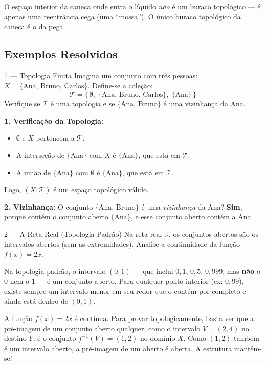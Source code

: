 \begin{notebox}[title={Intuição sobre Buracos}]
  O espaço interior da caneca onde entra o líquido \emph{não} é um buraco topológico — é apenas uma reentrância cega (uma ``mossa''). O único buraco topológico da caneca é o da pega.
\end{notebox}

\subsection{Exemplos Resolvidos}

\begin{exbox}{1 --- Topologia Finita}
  Imagina um conjunto com três pessoas: $X = \{\text{Ana, Bruno, Carlos}\}$. Define-se a coleção:
  \[
    \mathcal{T} = \bigl\{\, \emptyset,\; \{\text{Ana, Bruno, Carlos}\},\; \{\text{Ana}\} \,\bigr\}
  \]
  Verifique se $\mathcal{T}$ é uma topologia e se $\{\text{Ana, Bruno}\}$ é uma vizinhança da Ana.
\end{exbox}
\begin{solbox}
  \textbf{1. Verificação da Topologia:}
  \begin{itemize}
    \item $\emptyset$ e $X$ pertencem a $\mathcal{T}$. \checkmark
    \item A interseção de $\{\text{Ana}\}$ com $X$ é $\{\text{Ana}\}$, que está em $\mathcal{T}$. \checkmark
    \item A união de $\{\text{Ana}\}$ com $\emptyset$ é $\{\text{Ana}\}$, que está em $\mathcal{T}$. \checkmark
  \end{itemize}
  Logo, $(X, \mathcal{T})$ é um espaço topológico válido.
  
  \textbf{2. Vizinhança:}
  O conjunto $\{\text{Ana, Bruno}\}$ é uma \emph{vizinhança} da Ana? \textbf{Sim}, porque contém o conjunto aberto $\{\text{Ana}\}$, e esse conjunto aberto contém a Ana.
\end{solbox}

\begin{exbox}{2 --- A Reta Real (Topologia Padrão)}
  Na reta real $\mathbb{R}$, os conjuntos abertos são os intervalos abertos (sem as extremidades). Analise a continuidade da função $f(x) = 2x$.
\end{exbox}
\begin{solbox}
  Na topologia padrão, o intervalo $(0, 1)$ — que inclui $0{,}1$, $0{,}5$, $0{,}999$, mas \textbf{não} o $0$ nem o $1$ — é um conjunto aberto. Para qualquer ponto interior (ex: $0{,}99$), existe sempre um intervalo menor em seu redor que o contém por completo e ainda está dentro de $(0,1)$.

  A função $f(x) = 2x$ é contínua. Para provar topologicamente, basta ver que a pré-imagem de um conjunto aberto qualquer, como o intervalo $V = (2, 4)$ no destino $Y$, é o conjunto $f^{-1}(V) = (1, 2)$ no domínio $X$. Como $(1, 2)$ também é um intervalo aberto, a pré-imagem de um aberto é aberta. A estrutura mantém-se!
\end{solbox}

